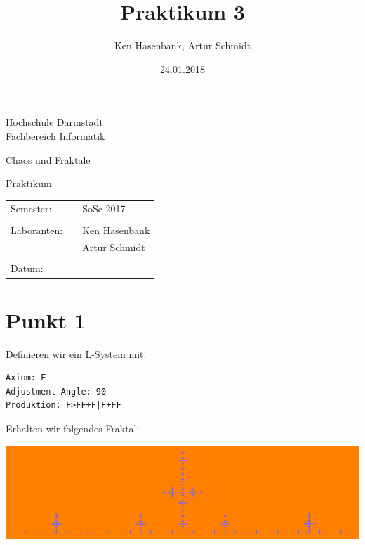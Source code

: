 \documentclass[10pt,a4paper]{article}
\author{Ken Hasenbank, Artur Schmidt}
\title{Praktikum 3}
\date{24.01.2018}
\begin{document}

\begin{titlepage}
\begin{center}
	\Large{Hochschule Darmstadt}\\
	\large{Fachbereich Informatik}
\end{center}

\vspace{1cm}
\begin{center}
	\large{Chaos und Fraktale}
\end{center}

\vspace{2,5cm}
\begin{center}
	\huge{Praktikum}\\
\end{center}



\vspace{6cm}
\begin{center}
{\large 
\begin{tabular}{lll}
	Semester: && SoSe 2017\\
	\vspace{1mm}\\
	Laboranten: && Ken Hasenbank\\
	&& Artur Schmidt\\
	\vspace{1 mm}\\
	Datum:	&& \@date\\
	\end{tabular} 
	}%
\end{center}

\end{titlepage}

\section{Punkt 1}
Definieren wir ein L-System mit:
\begin{lstlisting}
Axiom: F
Adjustment Angle: 90
Produktion: F>FF+F|F+FF
\end{lstlisting}

Erhalten wir folgendes Fraktal:
\begin{center}
	\includegraphics[scale=0.5]{images/lin.PNG}
\end{center}
\end{document}
